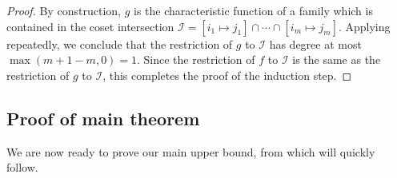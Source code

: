\documentclass{article}
\theoremstyle{definition}
\providecommand{\coset}[2]{[#1 \mapsto #2]}
\begin{document}
\begin{proof}
By construction, $g$ is the characteristic function of a family which is contained in the coset intersection $\mathcal{I} = \coset{i_1}{j_1} \cap \cdots \cap \coset{i_m}{j_m}$. Applying  repeatedly, we conclude that the restriction of $g$ to $\mathcal{I}$ has degree at most $\max(m+1-m,0) = 1$. Since the restriction of $f$ to $\mathcal{I}$ is the same as the restriction of $g$ to $\mathcal{I}$, this completes the proof of the induction step.
\end{proof}

\subsection{Proof of main theorem} \label{sec:proof-sym}

We are now ready to prove our main upper bound, from which  will quickly follow.
\end{document}

